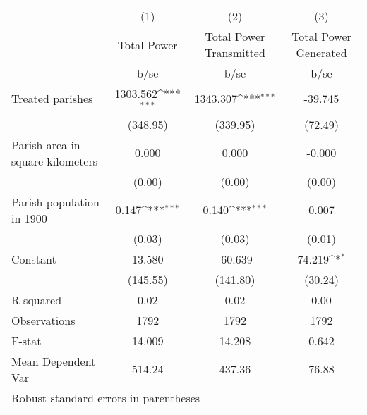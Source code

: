 {
\def\sym#1{\ifmmode^{#1}\else\(^{#1}\)\fi}
\begin{tabular}{l*{3}{c}}
\hline\hline
                    &\multicolumn{1}{c}{(1)}         &\multicolumn{1}{c}{(2)}         &\multicolumn{1}{c}{(3)}         \\
                    & Total Power         &Total Power Transmitted         &Total Power Generated         \\
                    &        b/se         &        b/se         &        b/se         \\
\hline
Treated parishes    &    1303.562\sym{***}&    1343.307\sym{***}&     -39.745         \\
                    &    (348.95)         &    (339.95)         &     (72.49)         \\
Parish area in square kilometers&       0.000         &       0.000         &      -0.000         \\
                    &      (0.00)         &      (0.00)         &      (0.00)         \\
Parish population in 1900&       0.147\sym{***}&       0.140\sym{***}&       0.007         \\
                    &      (0.03)         &      (0.03)         &      (0.01)         \\
Constant            &      13.580         &     -60.639         &      74.219\sym{*}  \\
                    &    (145.55)         &    (141.80)         &     (30.24)         \\
\hline
R-squared           &        0.02         &        0.02         &        0.00         \\
Observations        &        1792         &        1792         &        1792         \\
F-stat              &      14.009         &      14.208         &       0.642         \\
Mean Dependent Var  &      514.24         &      437.36         &       76.88         \\
\hline\hline
\multicolumn{4}{l}{\footnotesize Robust standard errors in parentheses}\\
\end{tabular}
}
